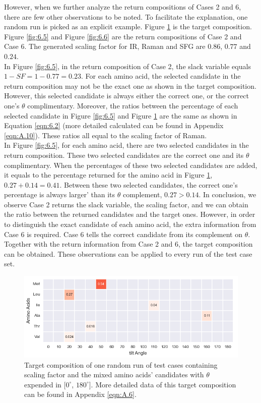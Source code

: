 However, when we further analyze the return compositions of Cases 2 and 6, there are few other observations to be noted. To facilitate the explanation, one random run is picked as an explicit example. Figure \ref{fig:6.4} is the target composition. Figure \ref{fig:6.5} and Figure \ref{fig:6.6} are the return compositions of Case 2 and Case 6. The generated scaling factor for IR, Raman and SFG are $0.86$, $0.77$ and $0.24$. \\

In Figure \ref{fig:6.5}, in the return composition of Case 2, the slack variable equals $1-SF = 1-0.77 = 0.23$. For each amino acid, the selected candidate in the return composition may not be the exact one as shown in the target composition. However, this selected candidate is always either the correct one, or the correct one's $\theta$ complimentary. Moreover, the ratios between the percentage of each selected candidate in Figure \ref{fig:6.5} and Figure \ref{fig:6.4} are the same as shown in Equation \ref{eqn:6.2} (more detailed calculated can be found in Appendix \ref{eqn:A.10}). These ratios all equal to the scaling factor of Raman. \\

In Figure \ref{fig:6.5}, for each amino acid, there are two selected candidates in the return composition. These two selected candidates are the correct one and its $\theta$ complimentary. When the percentages of these two selected candidates are added, it equals to the percentage returned for the amino acid in Figure \ref{fig:6.4}, $0.27 + 0.14 = 0.41$. Between these two selected candidates, the correct one's percentage is always larger' than its $\theta$ complement, $0.27 > 0.14$. In conclusion, we observe Case 2 returns the slack variable, the scaling factor, and we can obtain the ratio between the returned candidates and the target ones. However, in order to distinguish the exact candidate of each amino acid, the extra information from Case 6 is required. Case 6 tells the correct candidate from its complement on $\theta$. Together with the return information from Case 2 and 6, the target composition can be obtained. These observations can be applied to every run of the test case set.\\


\begin{figure}[!ht] 
\centering
\includegraphics[scale=0.7]{Figures/chapter6_figure_five.png}
\caption{Target composition of one random run of test cases containing scaling factor and the mixed amino acids' candidates with $\theta$ expended in $[0^{\circ}$, $180^{\circ}]$. More detailed data of this target composition can be found in Appendix \ref{eqn:A.6}.} \label{fig:6.4}
\end{figure}

